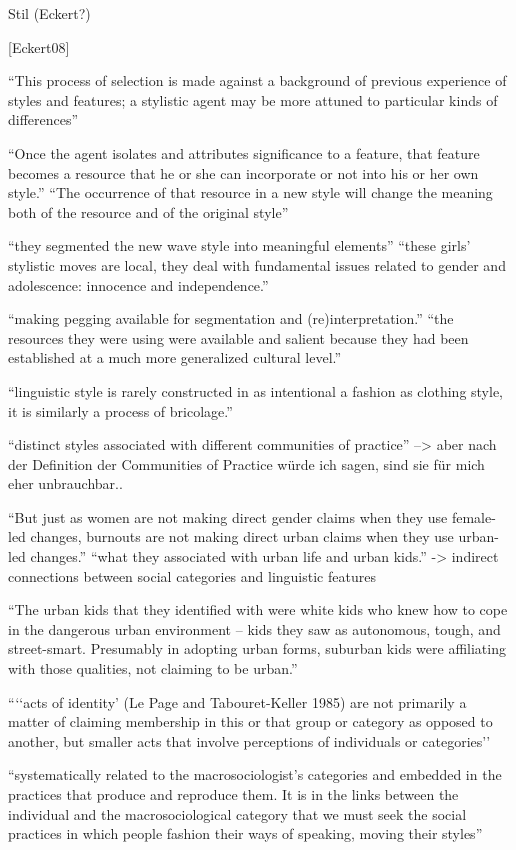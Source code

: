 Stil (Eckert?)

[Eckert08]


``This process of selection is made
against a background of previous experience of styles and features; a stylistic
agent may be more attuned to particular kinds of differences''

``Once the agent
isolates and attributes significance to a feature, that feature becomes a resource
that he or she can incorporate or not into his or her own style.''
``The occurrence
of that resource in a new style will change the meaning both of the resource and
of the original style''

``they segmented the new wave style into meaningful elements''
``these girls’ stylistic moves are local,
they deal with fundamental issues related to gender and adolescence: innocence
and independence.''

``making pegging available for segmentation and (re)interpretation.''
``the resources they were using
were available and salient because they had been established at a much more
generalized cultural level.''

``linguistic style is rarely constructed in as intentional a fashion
as clothing style, it is similarly a process of bricolage.''

``distinct styles associated with different communities of practice''
--> aber nach der Definition der Communities of Practice würde ich sagen, sind sie für mich eher unbrauchbar..

``But just as women are not making direct gender claims when they use female-
led changes, burnouts are not making direct urban claims when they use
urban-led changes.''
``what they associated with urban life and urban kids.''
-> indirect connections between social categories and linguistic features

``The urban kids that they identified with were white kids who knew
how to cope in the dangerous urban environment – kids they saw as autonomous,
tough, and street-smart. Presumably in adopting urban forms, suburban kids
were affiliating with those qualities, not claiming to be urban.''

```‘acts of identity’ (Le Page and Tabouret-Keller 
1985) are not primarily a matter of claiming membership in this or that group
or category as opposed to another, but smaller acts that involve perceptions of
individuals or categories''

``systematically related to the macrosociologist’s categories
and embedded in the practices that produce and reproduce them. It is in the
links between the individual and the macrosociological category that we must
seek the social practices in which people fashion their ways of speaking, moving
their styles''


